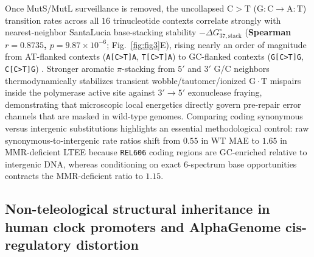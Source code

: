 \documentclass[10pt,letterpaper]{article}
\theoremstyle{plain}
\theoremstyle{definition}
\begin{document}
Once MutS/MutL surveillance is removed, the uncollapsed $\mathrm{C{>}T}$ ($\mathrm{G{:}C \to A{:}T}$) transition rates across all $16$ trinucleotide contexts correlate strongly with nearest-neighbor SantaLucia base-stacking stability $-\Delta G^\circ_{37,\mathrm{stack}}$ (\textbf{Spearman $r = 0.8735$, $p = 9.87 \times 10^{-6}$}; Fig.~\ref{fig:fig3}E), rising nearly an order of magnitude from AT-flanked contexts (\texttt{A[C>T]A}, \texttt{T[C>T]A}) to GC-flanked contexts (\texttt{G[C>T]G}, \texttt{C[C>T]G}) \cite{lee2012pnas,foster2018genetics}. Stronger aromatic $\pi$-stacking from $5'$ and $3'$ G/C neighbors thermodynamically stabilizes transient wobble/tautomer/ionized $\mathrm{G}\cdot\mathrm{T}$ mispairs inside the polymerase active site against $3'\to 5'$ exonuclease fraying, demonstrating that microscopic local energetics directly govern pre-repair error channels that are masked in wild-type genomes. Comparing coding synonymous versus intergenic substitutions highlights an essential methodological control: raw synonymous-to-intergenic rate ratios shift from $0.55$ in WT MAE to $1.65$ in MMR-deficient LTEE because \texttt{REL606} coding regions are GC-enriched relative to intergenic DNA, whereas conditioning on exact 6-spectrum base opportunities contracts the MMR-deficient ratio to $1.15$.

\subsection*{Non-teleological structural inheritance in human clock promoters and AlphaGenome cis-regulatory distortion}
\end{document}
